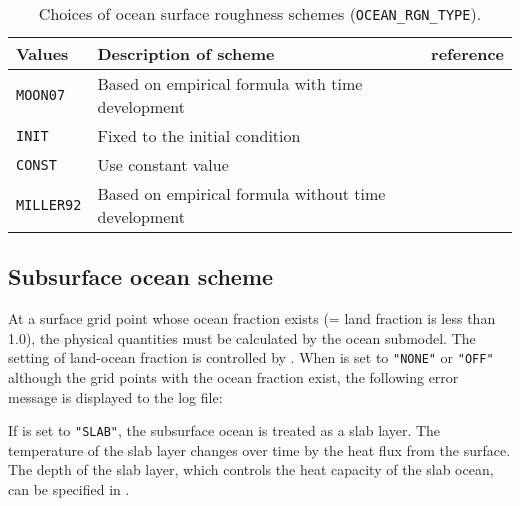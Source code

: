 \begin{table}[h]
\begin{center}
  \caption{Choices of ocean surface roughness schemes (\texttt{OCEAN\_RGN\_TYPE}).}
  \label{tab:nml_ocean_rgn}
  \begin{tabularx}{150mm}{llX} \hline
    \rowcolor[gray]{0.9}  Values & Description of scheme & reference \\ \hline
      \verb|MOON07|   & Based on empirical formula with time development    & \citet{moon_2007} \\
      \verb|INIT|     & Fixed to the initial condition \\
      \verb|CONST|    & Use constant value \\
      \verb|MILLER92| & Based on empirical formula without time development & \citet{miller_1992} \\
    \hline
  \end{tabularx}
\end{center}
\end{table}


\clearpage
\subsection{Subsurface ocean scheme}

At a surface grid point whose ocean fraction exists (= land fraction is less than 1.0),
the physical quantities must be calculated by the ocean submodel.
The setting of land-ocean fraction is controlled by .
When  is set to \verb|"NONE"| or \verb|"OFF"| although the grid points with the ocean fraction exist, the following error message is displayed to the log file:


If  is set to \verb|"SLAB"|, the subsurface ocean is treated as a slab layer. The temperature of the slab layer changes over time by the heat flux from the surface. The depth of the slab layer, which controls the heat capacity of the slab ocean, can be specified  in .

